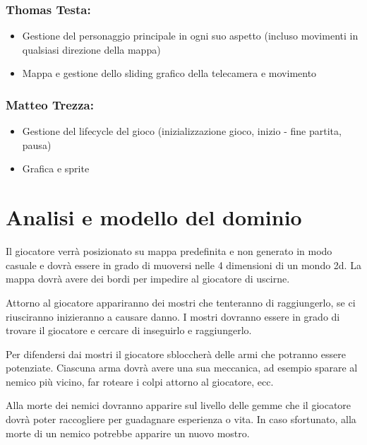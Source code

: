 \documentclass[a4paper,12pt]{report}
\begin{document}
\paragraph{}

\subsubsection*{Thomas Testa:}
\begin{itemize}
	\item Gestione del personaggio principale in ogni suo aspetto (incluso movimenti in qualsiasi direzione della mappa)
	\item Mappa e gestione dello sliding grafico della telecamera e movimento
\end{itemize}

\paragraph{}

\subsubsection*{Matteo Trezza:}
\begin{itemize}
	\item Gestione del lifecycle del gioco (inizializzazione gioco, inizio - fine partita, pausa)
	\item Grafica e sprite
\end{itemize}


\section{Analisi e modello del dominio}
Il giocatore verrà posizionato su mappa predefinita e non generato in modo casuale e dovrà essere in grado di muoversi nelle 4 dimensioni di un mondo 2d. 
La mappa dovrà avere dei bordi per impedire al giocatore di uscirne. 


Attorno al giocatore appariranno dei mostri che tenteranno di raggiungerlo, se ci riusciranno inizieranno a causare danno. I mostri dovranno essere in grado di trovare il giocatore e cercare di inseguirlo e raggiungerlo.
 
 
Per difendersi dai mostri il giocatore sbloccherà delle armi che potranno essere potenziate. Ciascuna arma dovrà avere una sua meccanica, ad esempio sparare al nemico più vicino, far roteare i colpi attorno al giocatore, ecc. 
 
 
Alla morte dei nemici dovranno apparire sul livello delle gemme che il giocatore dovrà poter raccogliere per guadagnare esperienza o vita. In caso sfortunato, alla morte di un nemico potrebbe apparire un nuovo mostro.
 
\end{document}
